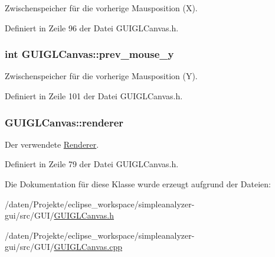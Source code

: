 Zwischenspeicher für die vorherige Mausposition (X). 



Definiert in Zeile 96 der Datei G\-U\-I\-G\-L\-Canvas.\-h.

\hypertarget{classGUIGLCanvas_a684c82bd591f01b5f600c9589158e0e0}{
\subsubsection[{prev\-\_\-mouse\-\_\-y}]{\setlength{\rightskip}{0pt plus 5cm}int G\-U\-I\-G\-L\-Canvas\-::prev\-\_\-mouse\-\_\-y\hspace{0.3cm}{\ttfamily [private]}}}\label{classGUIGLCanvas_a684c82bd591f01b5f600c9589158e0e0}


Zwischenspeicher für die vorherige Mausposition (Y). 



Definiert in Zeile 101 der Datei G\-U\-I\-G\-L\-Canvas.\-h.

\hypertarget{classGUIGLCanvas_a33a4ad3bc364d697396c55d011bfac44}{
\subsubsection[{renderer}]{ G\-U\-I\-G\-L\-Canvas\-::renderer\hspace{0.3cm}{\ttfamily [private]}}}\label{classGUIGLCanvas_a33a4ad3bc364d697396c55d011bfac44}


Der verwendete \hyperlink{classRenderer}{Renderer}. 



Definiert in Zeile 79 der Datei G\-U\-I\-G\-L\-Canvas.\-h.



Die Dokumentation für diese Klasse wurde erzeugt aufgrund der Dateien\-:\begin{DoxyCompactItemize}
\item 
/daten/\-Projekte/eclipse\-\_\-workspace/simpleanalyzer-\/gui/src/\-G\-U\-I/\hyperlink{GUIGLCanvas_8h}{G\-U\-I\-G\-L\-Canvas.\-h}\item 
/daten/\-Projekte/eclipse\-\_\-workspace/simpleanalyzer-\/gui/src/\-G\-U\-I/\hyperlink{GUIGLCanvas_8cpp}{G\-U\-I\-G\-L\-Canvas.\-cpp}\end{DoxyCompactItemize}
